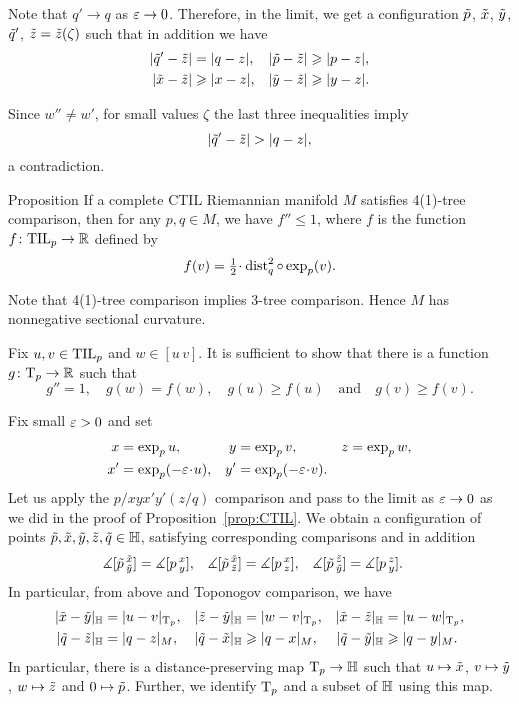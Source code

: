 Note that $q'\to q$ as $\eps\to0$. 
Therefore, in the limit,
we get a configuration $\~p$, $\~x$, $\~y$, $\~q'$, $\~z=\~z(\zeta)$ such that in addition we have
\begin{align*}
|\~q'-\~z|&=|q-z|,
&
|\~p-\~z|&\ge |p-z|,
\\
|\~x-\~z|&\ge |x-z|,
&
|\~y-\~z|&\ge |y-z|.
\end{align*}

Since $w''\ne w'$, for small values $\zeta$ the last three inequalities 
imply 
\[|\~q'-\~z|>|q-z|,\]
a contradiction.
\qeds

\begin{thm}{Proposition}\label{prop:convex}
If  a complete CTIL Riemannian manifold $M$ satisfies 4(1)-tree comparison,
then for any $p,q\in M$, we have $f''\le 1$, where $f$ is the function $f\: \TIL_p\to \RR$ defined by
\[f(v)=\tfrac12\cdot\dist_q^2\circ\exp_p(v).\]

\end{thm}

Note that 4(1)-tree comparison implies 3-tree comparison.
Hence $M$ has nonnegative sectional curvature.

Fix $u,v\in \TIL_p$ and $w\in [u\,v]$.
It is sufficient to show that there is a function $g\:\T_p\to \RR$ such that
\[g''=1,\quad
g(w)=f(w),\quad
g(u)\ge f(u)\quad
\text{and}\quad
g(v)\ge f(v).\]

Fix small $\eps>0$ and set
\begin{align*}
x&=\exp_p u,
&y&=\exp_p v, 
&z&=\exp_pw,
\\
x'&=\exp_p(-\eps\cdot  u),
&y'&=\exp_p(-\eps\cdot  v).
\end{align*}
Let us apply the $p/xyx'y'(z/q)$ comparison and pass to the limit as $\eps\to 0$
as we did in the proof of Proposition~\ref{prop:CTIL}.
We obtain a configuration of points $\~p, \~x, \~y, \~z, \~q\in\HH$, satisfying corresponding comparisons and
in addition
\begin{align*}
\measuredangle[\~p\,^{\~x}_{\~y}]&= \measuredangle[p\,^{x}_{y}],
&\measuredangle[\~p\,^{\~x}_{\~z}]&= \measuredangle[p\,^{x}_{z}],
&\measuredangle[\~p\,^{\~z}_{\~y}]&= \measuredangle[p\,^{z}_{y}].
\end{align*}
In particular,
from above and Toponogov comparison, we have
\begin{align*}
|\~x-\~y|_\HH&=|u-v|_{\T_p},
&|\~z-\~y|_\HH&=|w-v|_{\T_p},
&|\~x-\~z|_\HH&=|u-w|_{\T_p},
\\
|\~q-\~z|_\HH&=|q-z|_M,
&|\~q-\~x|_\HH&\ge|q-x|_M,
&|\~q-\~y|_\HH&\ge|q-y|_M.
\end{align*}
In particular, there is a distance-preserving map $\T_p\to \HH$ 
such that $u\mapsto \~x$, $v\mapsto \~y$, $w\mapsto \~z$ and $0\mapsto \~p$.
Further, we identify $\T_p$ and a subset of $\HH$ using this map.

